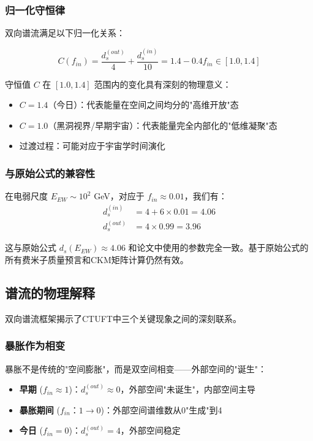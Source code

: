 \subsubsection{归一化守恒律}

双向谱流满足以下归一化关系：

\begin{equation}
C(f_{in}) = \frac{d_s^{(out)}}{4} + \frac{d_s^{(in)}}{10} = 1.4 - 0.4f_{in} \in [1.0, 1.4]
\label{eq:normalized_conservation}
\end{equation}

守恒值 $C$ 在 $[1.0, 1.4]$ 范围内的变化具有深刻的物理意义：
\begin{itemize}
    \item $C = 1.4$（今日）：代表能量在空间之间均分的"高维开放"态
    \item $C = 1.0$（黑洞视界/早期宇宙）：代表能量完全内部化的"低维凝聚"态
    \item 过渡过程：可能对应于宇宙学时间演化
\end{itemize}

\subsubsection{与原始公式的兼容性}

在电弱尺度 $E_{EW} \sim 10^2$ GeV，对应于 $f_{in} \approx 0.01$，我们有：
\begin{align}
d_s^{(in)} &= 4 + 6 \times 0.01 = 4.06 \\
d_s^{(out)} &= 4 \times 0.99 = 3.96
\end{align}

这与原始公式 $d_s(E_{EW}) \approx 4.06$ 和论文中使用的参数完全一致。基于原始公式的所有费米子质量预言和CKM矩阵计算仍然有效。

\subsection{谱流的物理解释}
\label{sec:spectral_interpretation}

双向谱流框架揭示了CTUFT中三个关键现象之间的深刻联系。

\subsubsection{暴胀作为相变}

暴胀不是传统的"空间膨胀"，而是双空间相变——外部空间的"诞生"：

\begin{itemize}
    \item \textbf{早期} ($f_{in} \approx 1$)：$d_s^{(out)} \approx 0$，外部空间"未诞生"，内部空间主导
    \item \textbf{暴胀期间} ($f_{in}$：$1 \to 0$)：外部空间谱维数从0"生成"到4
    \item \textbf{今日} ($f_{in} = 0$)：$d_s^{(out)} = 4$，外部空间稳定
\end{itemize}

